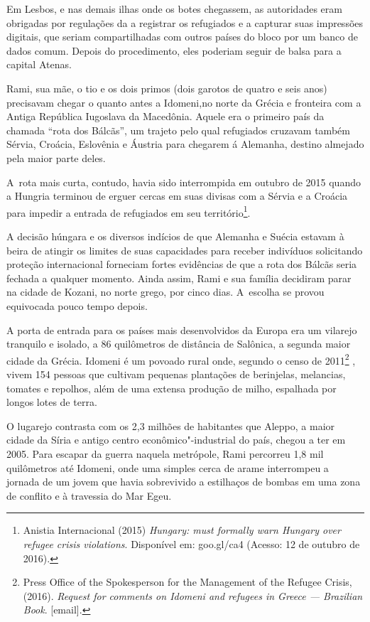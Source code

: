 Em Lesbos, e nas demais ilhas onde os botes chegassem, as autoridades
eram obrigadas por regulações da  a registrar os refugiados e a
capturar suas impressões digitais, que seriam compartilhadas com outros
países do bloco por um banco de dados comum. Depois do procedimento,
eles poderiam seguir de balsa para a capital Atenas.

Rami, sua mãe, o tio e os dois primos (dois garotos de quatro e seis
anos) precisavam chegar o quanto antes a Idomeni,no norte da Grécia e fronteira com a Antiga República Iugoslava da Macedônia. Aquele era o primeiro país da chamada ``rota dos Bálcãs'', um trajeto pelo qual refugiados cruzavam também Sérvia, Croácia, Eslovênia e Áustria para chegarem á Alemanha, destino almejado pela maior parte deles.

A~rota mais curta, contudo, havia sido interrompida em outubro de 2015 quando a
Hungria terminou de erguer cercas em suas divisas com a Sérvia e a
Croácia para impedir a entrada de refugiados em seu
território\footnote{ Anistia Internacional (2015) \emph{Hungary:  must
formally warn Hungary over refugee crisis violations}. Disponível em:
goo.gl/ca4
(Acesso: 12 de outubro de 2016).}.

A decisão húngara e os diversos indícios de que Alemanha e Suécia
estavam à beira de atingir os limites de suas capacidades para receber
indivíduos solicitando proteção internacional forneciam fortes
evidências de que a rota dos Bálcãs seria fechada a qualquer momento.
Ainda assim, Rami e sua família decidiram parar na cidade de Kozani, no
norte grego, por cinco dias. A~escolha se provou equivocada pouco
tempo depois.

A porta de entrada para os países mais desenvolvidos da Europa era um
vilarejo tranquilo e isolado, a 86 quilômetros de distância de Salônica,
a segunda maior cidade da Grécia. Idomeni é um povoado rural onde,
segundo o censo de 2011\footnote{ Press Office of the Spokesperson for the Management
of the Refugee Crisis, (2016). \emph{Request for comments on Idomeni and
refugees in Greece --- Brazilian Book}. {[}email{]}.} , vivem 154 pessoas que
cultivam pequenas plantações de berinjelas, melancias, tomates e
repolhos, além de uma extensa produção de milho, espalhada por longos
lotes de terra.

O lugarejo contrasta com os 2,3 milhões de habitantes que Aleppo, a
maior cidade da Síria e antigo centro econômico"-industrial do país,
chegou a ter em 2005. Para escapar da guerra naquela metrópole, Rami
percorreu 1,8 mil quilômetros até Idomeni, onde uma simples cerca de
arame interrompeu a jornada de um jovem que havia sobrevivido a
estilhaços de bombas em uma zona de conflito e à travessia do Mar Egeu.

